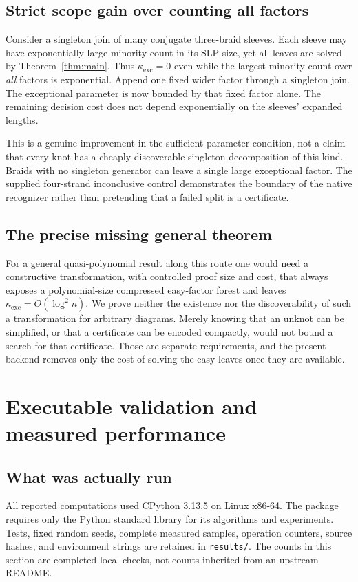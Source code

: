 \documentclass[11pt,letterpaper]{article}
\theoremstyle{definition}\newtheorem{definition}[theorem]{Definition}
\theoremstyle{remark}\newtheorem{remark}[theorem]{Remark}
\newcommand{\exc}{\mathrm{exc}}
\begin{document}
\subsection{Strict scope gain over counting all factors}
Consider a singleton join of many conjugate three-braid sleeves. Each sleeve may have exponentially large minority count in its SLP size, yet all leaves are solved by Theorem~\ref{thm:main}. Thus $\kappa_{\exc}=0$ even while the largest minority count over \emph{all} factors is exponential. Append one fixed wider factor through a singleton join. The exceptional parameter is now bounded by that fixed factor alone. The remaining decision cost does not depend exponentially on the sleeves' expanded lengths.

This is a genuine improvement in the sufficient parameter condition, not a claim that every knot has a cheaply discoverable singleton decomposition of this kind. Braids with no singleton generator can leave a single large exceptional factor. The supplied four-strand inconclusive control demonstrates the boundary of the native recognizer rather than pretending that a failed split is a certificate.

\subsection{The precise missing general theorem}
For a general quasi-polynomial result along this route one would need a constructive transformation, with controlled proof size and cost, that always exposes a polynomial-size compressed easy-factor forest and leaves $\kappa_{\exc}=O(\log^2 n)$. We prove neither the existence nor the discoverability of such a transformation for arbitrary diagrams. Merely knowing that an unknot can be simplified, or that a certificate can be encoded compactly, would not bound a search for that certificate. Those are separate requirements, and the present backend removes only the cost of solving the easy leaves once they are available.

\section{Executable validation and measured performance}
\subsection{What was actually run}
All reported computations used CPython 3.13.5 on Linux x86-64. The package requires only the Python standard library for its algorithms and experiments. Tests, fixed random seeds, complete measured samples, operation counters, source hashes, and environment strings are retained in \texttt{results/}. The counts in this section are completed local checks, not counts inherited from an upstream README.
\end{document}

